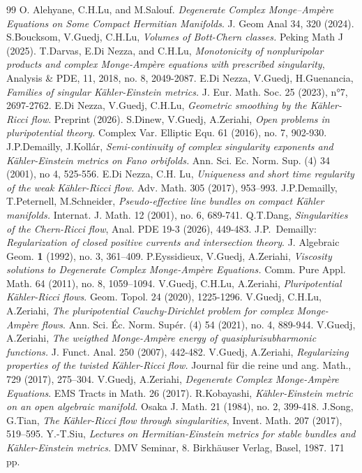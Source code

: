 \documentclass[10pt,a4paper]{amsart}
\numberwithin{equation}{section}
\begin{document}
\begin{thebibliography}{99}
 O. Alehyane, C.H.Lu, and M.Salouf. {\it Degenerate Complex Monge–Ampère Equations on Some Compact Hermitian Manifolds}. J. Geom Anal 34, 320 (2024).
 S.Boucksom, V.Guedj, C.H.Lu, {\em Volumes of Bott-Chern classes.} Peking Math J (2025).
 T.Darvas, E.Di Nezza, and C.H.Lu, {\em Monotonicity of nonpluripolar products and complex {M}onge-{A}mp\`ere equations with prescribed singularity}, {Analysis \& PDE}, {11}, {2018}, no. {8}, {2049-2087}.
 E.Di Nezza, V.Guedj, H.Guenancia, {\em Families of singular K\"ahler-Einstein metrics.} J. Eur. Math. Soc. 25 (2023), n°7, 2697-2762.
 E.Di Nezza, V.Guedj, C.H.Lu, {\em Geometric smoothing by the K\"ahler-Ricci flow}. Preprint (2026).
 S.Dinew, V.Guedj, A.Zeriahi, {\em Open problems in pluripotential theory.} Complex Var. Elliptic Equ. 61 (2016), no. 7, 902-930.
 J.P.Demailly, J.Koll\'ar, {\em Semi-continuity of complex singularity exponents and K\"ahler-Einstein metrics on Fano orbifolds.} Ann. Sci. Ec. Norm. Sup. (4) { 34} (2001), no 4, 525-556.
 E.Di Nezza, C.H. Lu, {\em Uniqueness and short time regularity of the weak K\"ahler-Ricci flow.} Adv. Math. { 305} (2017), 953--993.
 J.P.Demailly, T.Peternell, M.Schneider, {\em Pseudo-effective line bundles on compact K\"ahler manifolds.} Internat. J. Math. 12 (2001), no. 6, 689-741.
 Q.T.Dang, {\it Singularities of the Chern-Ricci flow}, Anal. PDE 19-3 (2026), 449-483.
 J.P.~Demailly: {\em Regularization of closed positive currents and intersection theory}. J. Algebraic Geom. {\bf 1} (1992), no. 3, 361--409.
 P.Eyssidieux, V.Guedj, A.Zeriahi, {\em Viscosity solutions to Degenerate Complex Monge-Amp\`ere Equations.} Comm. Pure Appl. Math. { 64} (2011), no. 8, 1059--1094.
 V.Guedj, C.H.Lu, A.Zeriahi, {\em Pluripotential K\"ahler-Ricci flows}. Geom. Topol. 24 (2020), 1225-1296.
 V.Guedj, C.H.Lu, A.Zeriahi, {\em The pluripotential Cauchy-Dirichlet problem for complex Monge-Amp\`ere flows}. Ann. Sci. \'Ec. Norm. Sup\'er. (4) 54 (2021), no. 4, 889-944.
 V.Guedj, A.Zeriahi, {\em The weigthed Monge-Amp\`ere energy of quasiplurisubharmonic functions.} J. Funct. Anal. 250 (2007), 442-482.
 V.Guedj, A.Zeriahi, {\em Regularizing properties of the twisted K\"ahler-Ricci flow.} Journal f\"ur die reine und ang. Math., { 729} (2017), 275--304.
 V.Guedj, A.Zeriahi, {\em Degenerate Complex Monge-Amp\`ere Equations}. EMS Tracts in Math. { 26} (2017).
 R.Kobayashi, {\em K\"ahler-Einstein metric on an open algebraic manifold.} Osaka J. Math. 21 (1984), no. 2, 399-418.
 J.Song, G.Tian, \emph{The {K}\"ahler-{R}icci flow through singularities}, Invent. Math. {207} (2017), 519--595.
 Y.-T.Siu, {\it Lectures on Hermitian-Einstein metrics for stable bundles and K\"ahler-Einstein metrics.} DMV Seminar, 8. Birkhäuser Verlag, Basel, 1987. 171 pp.
\end{thebibliography}
\end{document}
